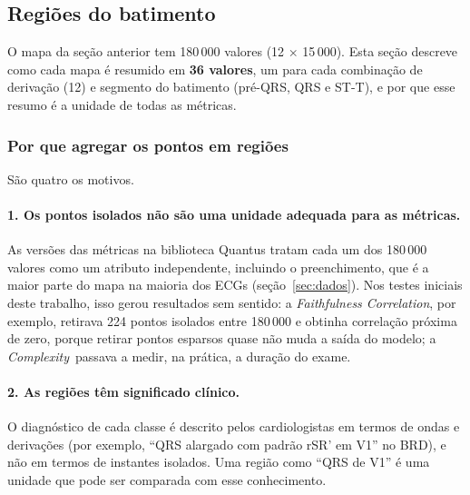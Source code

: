 \documentclass[11pt,a4paper]{article}
\newcommand{\FC}{\textit{Faithfulness Correlation}}
\newcommand{\CX}{\textit{Complexity}}
\begin{document}
\subsection{Regiões do batimento}\label{sec:regioes}

O mapa da seção anterior tem 180\,000 valores (12 × 15\,000). Esta seção descreve como cada mapa é resumido em \textbf{36 valores}, um para cada combinação de derivação (12) e segmento do batimento (pré-QRS, QRS e ST-T), e por que esse resumo é a unidade de todas as métricas.

\subsubsection{Por que agregar os pontos em regiões}
São quatro os motivos.

\paragraph{1. Os pontos isolados não são uma unidade adequada para as métricas.} As versões das métricas na biblioteca Quantus tratam cada um dos 180\,000 valores como um atributo independente, incluindo o preenchimento, que é a maior parte do mapa na maioria dos ECGs (seção~\ref{sec:dados}). Nos testes iniciais deste trabalho, isso gerou resultados sem sentido: a \FC, por exemplo, retirava 224 pontos isolados entre 180\,000 e obtinha correlação próxima de zero, porque retirar pontos esparsos quase não muda a saída do modelo; a \CX\ passava a medir, na prática, a duração do exame.

\paragraph{2. As regiões têm significado clínico.} O diagnóstico de cada classe é descrito pelos cardiologistas em termos de ondas e derivações (por exemplo, ``QRS alargado com padrão rSR' em V1'' no BRD), e não em termos de instantes isolados. Uma região como ``QRS de V1'' é uma unidade que pode ser comparada com esse conhecimento.
\end{document}
